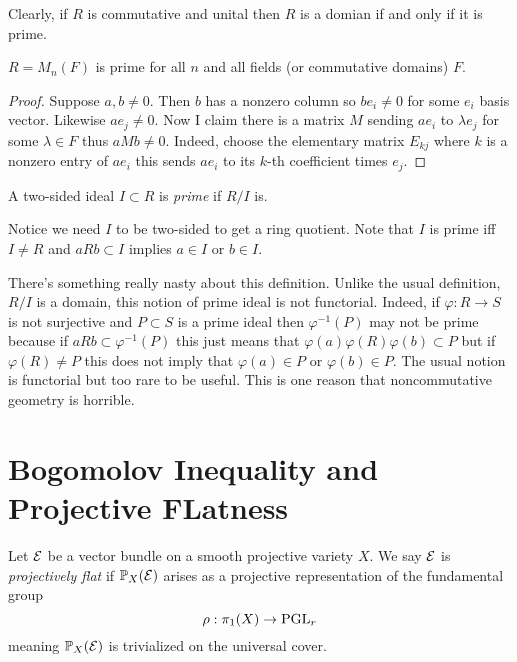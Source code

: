 \documentclass[12pt]{article}
\begin{document}
Clearly, if $R$ is commutative and unital then $R$ is a domian if and only if it is prime. 

\begin{lemma}
$R = M_n(F)$ is prime for all $n$ and all fields (or commutative domains) $F$.
\end{lemma}

\begin{proof}
Suppose $a,b \neq 0$. Then $b$ has a nonzero column so $b e_i \neq 0$ for some $e_i$ basis vector. Likewise $a e_j \neq 0$. Now I claim there is a matrix $M$ sending $a e_i$ to $\lambda e_j$ for some $\lambda \in F$ thus $a M b \neq 0$. Indeed, choose the elementary matrix $E_{kj}$ where $k$ is a nonzero entry of $a e_i$ this sends $a e_i$ to its $k$-th coefficient times $e_j$. 
\end{proof}

\begin{defn}
A two-sided ideal $I \subset R$ is \textit{prime} if $R / I$ is.
\end{defn}

Notice we need $I$ to be two-sided to get a ring quotient. Note that $I$ is prime iff $I \neq R$ and $a R b \subset I$ implies $a \in I$ or $b \in I$. 

\begin{rmk}
There's something really nasty about this definition. Unlike the usual definition, $R / I$ is a domain, this notion of prime ideal is not functorial. Indeed, if $\varphi : R \to S$ is not surjective and $P \subset S$ is a prime ideal then $\varphi^{-1}(P)$ may not be prime because if $a R b \subset \varphi^{-1}(P)$ this just means that $\varphi(a) \varphi(R) \varphi(b) \subset P$ but if $\varphi(R) \neq P$ this does not imply that $\varphi(a) \in P$ or $\varphi(b) \in P$. The usual notion is functorial but too rare to be useful. This is one reason that noncommutative geometry is horrible. 
\end{rmk}

\section{Bogomolov Inequality and Projective FLatness}

\begin{defn}
Let $\mathcal{E}$ be a vector bundle on a smooth projective variety $X$. We say $\mathcal{E}$ is \textit{projectively flat} if $\mathbb{P}_X(\mathcal{E})$ arises as a projective representation of the fundamental group
\[ \rho : \pi_1(X) \to \mathrm{PGL}_{r} \]
meaning $\mathbb{P}_X(\mathcal{E})$ is trivialized on the universal cover.
\end{defn}
\end{document}
